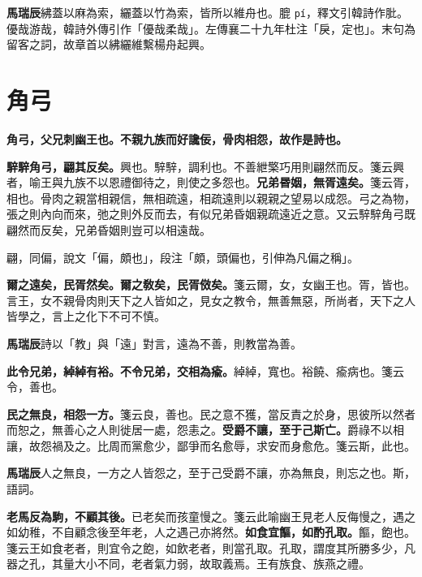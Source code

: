 \begin{quoting}\textbf{馬瑞辰}紼蓋以麻為索，纚蓋以竹為索，皆所以維舟也。膍 \texttt{pí}，釋文引韓詩作肶。優哉游哉，韓詩外傳引作「優哉柔哉」。左傳襄二十九年杜注「戾，定也」。末句為留客之詞，故章首以紼纚維繫楊舟起興。\end{quoting}

\section{角弓}


\textbf{角弓，父兄刺幽王也。不親九族而好讒佞，骨肉相怨，故作是詩也。}

\textbf{騂騂角弓，翩其反矣。}{\footnotesize 興也。騂騂，調利也。不善紲檠巧用則翩然而反。箋云興者，喻王與九族不以恩禮御待之，則使之多怨也。}\textbf{兄弟昬姻，無胥遠矣。}{\footnotesize 箋云胥，相也。骨肉之親當相親信，無相疏遠，相疏遠則以親親之望易以成怨。弓之為物，張之則內向而來，弛之則外反而去，有似兄弟昏姻親疏遠近之意。又云騂騂角弓既翩然而反矣，兄弟昏姻則豈可以相遠哉。}

\begin{quoting}翩，同偏，說文「偏，頗也」，段注「頗，頭偏也，引伸為凡偏之稱」。\end{quoting}

\textbf{爾之遠矣，民胥然矣。爾之敎矣，民胥傚矣。}{\footnotesize 箋云爾，女，女幽王也。胥，皆也。言王，女不親骨肉則天下之人皆如之，見女之教令，無善無惡，所尚者，天下之人皆學之，言上之化下不可不慎。}

\begin{quoting}\textbf{馬瑞辰}詩以「教」與「遠」對言，遠為不善，則教當為善。\end{quoting}

\textbf{此令兄弟，綽綽有裕。不令兄弟，交相為瘉。}{\footnotesize 綽綽，寬也。裕饒、瘉病也。箋云令，善也。}

\textbf{民之無良，相怨一方。}{\footnotesize 箋云良，善也。民之意不獲，當反責之於身，思彼所以然者而恕之，無善心之人則徙居一處，怨恚之。}\textbf{受爵不讓，至于己斯亡。}{\footnotesize 爵祿不以相讓，故怨禍及之。比周而黨愈少，鄙爭而名愈辱，求安而身愈危。箋云斯，此也。}

\begin{quoting}\textbf{馬瑞辰}人之無良，一方之人皆怨之，至于己受爵不讓，亦為無良，則忘之也。斯，語詞。\end{quoting}

\textbf{老馬反為駒，不顧其後。}{\footnotesize 已老矣而孩童慢之。箋云此喻幽王見老人反侮慢之，遇之如幼稚，不自顧念後至年老，人之遇己亦將然。}\textbf{如食宜饇，如酌孔取。}{\footnotesize 饇，飽也。箋云王如食老者，則宜令之飽，如飲老者，則當孔取。孔取，謂度其所勝多少，凡器之孔，其量大小不同，老者氣力弱，故取義焉。王有族食、族燕之禮。}

